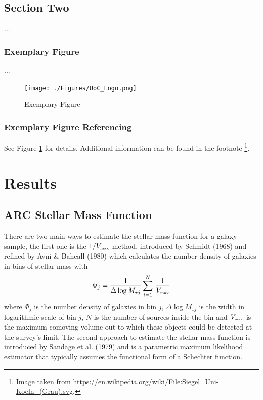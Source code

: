 \clearpage
\section{Section Two}
\label{sec:Section_Name}
...
\subsection{Exemplary Figure}
\label{subsec:Section_Name/fig}
...
\begin{figure}[htbp]
    \centering
    \texttt{[image: ./Figures/UoC\_Logo.png]}
    \caption{Exemplary Figure}
    \label{fig:UoC}
\end{figure}


\subsection{Exemplary Figure Referencing}
\label{subsec:Section_Name/fig_rfs}

See Figure \ref{fig:UoC} for details. Additional information can be
found in the footnote \footnote{Image taken from \url{https://en.wikipedia.org/wiki/File:Siegel_Uni-Koeln_(Grau).svg}.}.







\chapter{Results}
\label{chp:Res}
\captionsetup{width=0.75\textwidth}

\section{ARC Stellar Mass Function} \label{subsec:Res/ARC_SMF}
There are two main ways to estimate the stellar mass function for a galaxy sample\cite{Leja2020}, the first one is the $1/V_{\mbox{\tiny{max}}}$ method, introduced by Schmidt (1968)\cite{Schm1968} and refined by Avni \& Bahcall (1980)\cite{Avni1980} which calculates the number density of galaxies in bins of stellar mass with 
\begin{equation}
    \Phi_j = \dfrac{1}{\Delta \log M_{\star j}} \sum_{i=1}^N \, \dfrac{1}{V_{\mbox{\tiny{max}}}} \label{eq:SMF_schm} 
\end{equation} 
where $\Phi_j$ is the number density of galaxies in bin $j$, $\Delta \log M_{\star j}$ is the width in logarithmic scale of bin $j$, $N$ is the number of sources inside the bin and $V_{\mbox{\tiny{max}}}$ is the maximum comoving volume out to which these objects could be detected at the survey's limit. 
The second approach to estimate the stellar mass function is introduced by Sandage et al. (1979)\cite{Sand1979} and is a parametric maximum likelihood estimator that typically assumes the functional form of a Schechter\cite{Sche1976} function. 

